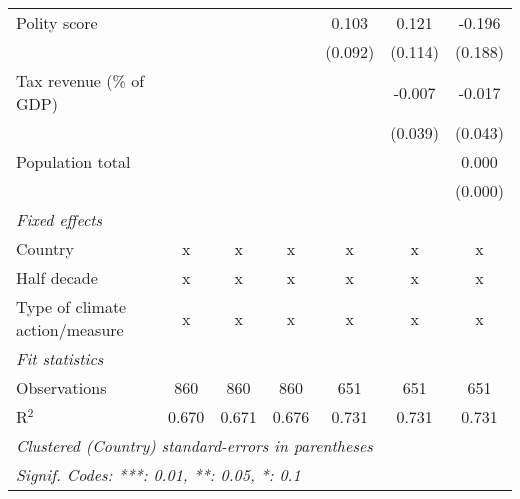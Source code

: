 \begin{tabular}{lcccccc}
   Polity score                                                &         &              &                & 0.103          & 0.121          & -0.196\\   
                                                               &         &              &                & (0.092)        & (0.114)        & (0.188)\\   
   Tax revenue (\% of GDP)                                     &         &              &                &                & -0.007         & -0.017\\   
                                                               &         &              &                &                & (0.039)        & (0.043)\\   
   Population total                                            &         &              &                &                &                & 0.000\\   
                                                               &         &              &                &                &                & (0.000)\\   
   \emph{Fixed effects}\\
   Country                                                     & x       & x            & x              & x              & x              & x\\  
   Half decade                                                 & x       & x            & x              & x              & x              & x\\  
   Type of climate action/measure                              & x       & x            & x              & x              & x              & x\\  
   \midrule \emph{Fit statistics}\\
   Observations                                                & 860     & 860          & 860            & 651            & 651            & 651\\  
   R$^2$                                                       & 0.670   & 0.671        & 0.676          & 0.731          & 0.731          & 0.731\\  
   \midrule
   \multicolumn{7}{l}{\emph{Clustered (Country) standard-errors in parentheses}}\\
   \multicolumn{7}{l}{\emph{Signif. Codes: ***: 0.01, **: 0.05, *: 0.1}}\\
\end{tabular}
\par\endgroup


